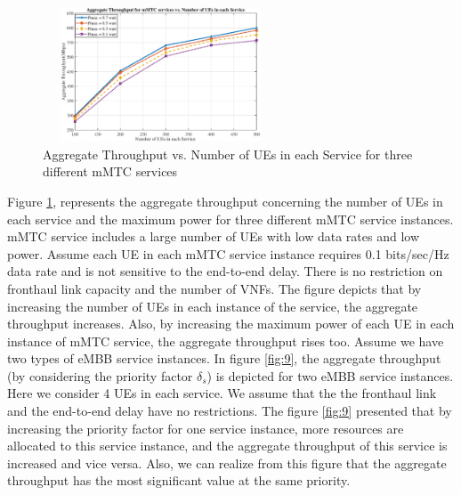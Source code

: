 \documentclass[lettersize,journal]{IEEEtran}
\begin{document}
\begin{figure}%
  \centering
  \captionsetup{justification=centering}
       \includegraphics[width=7cm,height=4cm]{AmmTCpower.eps}
  \caption{Aggregate Throughput vs. Number of UEs in each Service for three different mMTC services}
  \label{fig:8}
\end{figure}
Figure \ref{fig:8}, represents the aggregate throughput concerning the number of UEs in each service and the maximum power for three different mMTC service instances. mMTC service includes a large number of UEs with low data rates and low power.
Assume each UE in each mMTC service instance requires 0.1 bits/sec/Hz data rate and is not sensitive to the end-to-end delay. There is no restriction on fronthaul link capacity and the number of VNFs.
The figure depicts that by increasing the number of UEs in each instance of the service, the aggregate throughput increases.
Also, by increasing the maximum power of each UE in each instance of mMTC service, the aggregate throughput rises too.
Assume we have two types of eMBB service instances. In figure \ref{fig:9}, the aggregate throughput (by considering the priority factor $\delta_s$) is depicted for two eMBB service instances. Here we consider 4 UEs in each service. We assume that the the fronthaul link and the end-to-end delay have no restrictions.
The figure \ref{fig:9} presented that by increasing the priority factor for one service instance, more resources are allocated to this service instance, and the aggregate throughput of this service is increased and vice versa. Also, we can realize from this figure that the aggregate throughput has the most significant value at the same priority.
\end{document}
